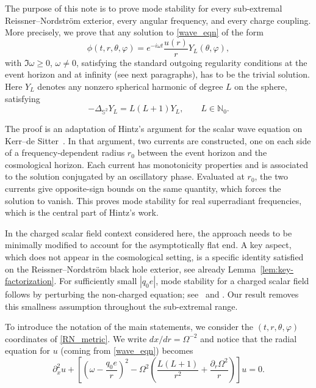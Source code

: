 \documentclass[11pt]{article}
\numberwithin{equation}{section}
\begin{document}
	The purpose of this note is to prove mode stability for every
	sub-extremal Reissner--Nordstr\"om exterior, every angular frequency, and every charge coupling. More precisely, we prove that any solution to \eqref{wave_eqn} of the form
	\begin{equation} \label{mode_solution}
		\phi(t, r, \theta, {\varphi}) = e^{-i\omega t} \frac{u(r)}{r}Y_L(\theta, {\varphi}),
	\end{equation}
	with $\Im \omega \ge 0$, $\omega \ne 0$,
	satisfying the standard outgoing regularity conditions at the event horizon and at infinity (see next paragraphs), has to be the trivial solution. Here $Y_L$ denotes {any nonzero spherical harmonic of degree $L$ on the sphere, satisfying}
	\[
	-\Delta_{\mathbb S^2}Y_L=L(L+1)Y_L,
	\qquad L\in\mathbb N_0.
	\]
	
	The proof is an adaptation
	of Hintz's argument for the scalar wave equation on
	Kerr--de Sitter~\cite{HintzKdS2026}. In that argument, two currents are constructed, one on each side of a frequency-dependent radius $r_0$ between the event horizon and the cosmological horizon. Each current has monotonicity properties and is associated to the solution conjugated by an oscillatory phase. Evaluated at $r_0$, the two currents give opposite-sign bounds on the same quantity, which forces the solution to vanish. This proves mode stability for real superradiant frequencies, which is the central part of Hintz's work.
	
	In the charged scalar field context considered here, the approach needs to be minimally modified to account for the asymptotically flat end. A key aspect, which does not appear in the cosmological setting, is a specific identity satisfied on the Reissner--Nordstr\"om black hole exterior, see already Lemma~\ref{lem:key-factorization}.	For sufficiently small $|q_0e|$, mode stability for a charged scalar field follows by perturbing
	the non-charged equation; see~\cite[Section~4]{Gajic2026I} and
	\cite[Section~1.1.7]{Gajic2026II}. Our result removes this smallness
	assumption throughout the sub-extremal range.
	
	To introduce the notation of the main statements, we consider the $(t, r, \theta, {\varphi})$ coordinates of \eqref{RN_metric}. We write $dx/dr=\Omega^{-2}$ and notice that the radial equation for $u$ (coming from \eqref{wave_eqn}) becomes
	\begin{equation} \label{radial_eqn}
		\partial_x^2u+
		\left[\left(\omega-\frac{q_0e}{r}\right)^2
		-\Omega^2\left(\frac{L(L+1)}{r^2}
		+\frac{\partial_r\Omega^2}{r}\right)\right]u=0.
	\end{equation}
	
\end{document}
